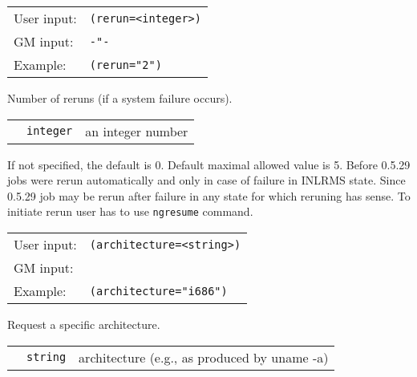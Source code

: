   \hspace*{0.5cm}
  \begin{shaded}
  \end{shaded}
  \begin{tabular}{lp{13cm}}
    User input:&\verb#(rerun=<integer>)#\\
    GM input:&\verb#-"-#\\
    Example:&\verb#(rerun="2")#\\
  \end{tabular}

  Number of reruns (if a system failure occurs).

  \begin{tabular}{llp{10cm}}
    \hspace*{1cm}&\texttt{integer}  & an integer number\\
  \end{tabular}
    
  If not specified, the default is 0. Default maximal allowed value is
  5. Before 0.5.29 jobs were rerun automatically and only in case of
  failure in INLRMS state. Since 0.5.29 job may be rerun after failure
  in any state for which reruning has sense. To initiate rerun user
  has to use \texttt{ngresume} command.

  \hspace*{0.5cm}
  \begin{shaded}
  \end{shaded}
  \begin{tabular}{lp{13cm}}
    User input:&\verb#(architecture=<string>)#\\
    GM input:&\\
    Example:&\verb#(architecture="i686")#\\
  \end{tabular}

  Request a specific architecture.

  \begin{tabular}{llp{10cm}}
    \hspace*{1cm}&\texttt{string} & architecture  (e.g., as produced by uname -a)\\
  \end{tabular}

